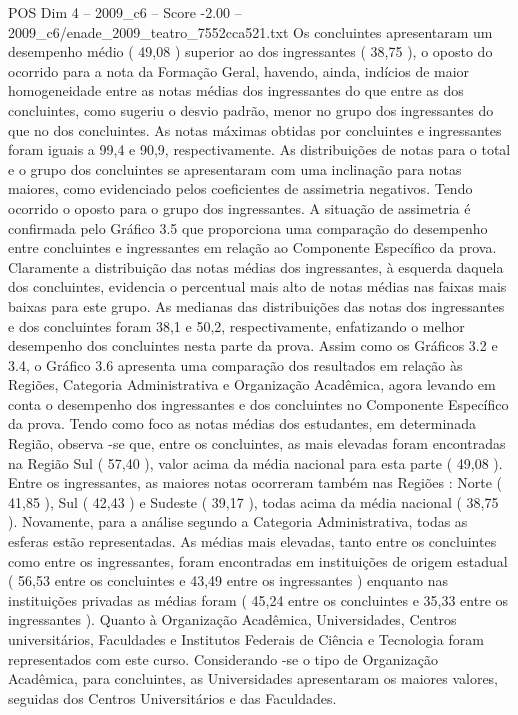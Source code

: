 \begin{textsample}{POS Dim 4 – 2009\_c6 – Score -2.00 – 2009\_c6/enade\_2009\_teatro\_7552cca521.txt}
Os concluintes apresentaram um desempenho médio ( 49,08 ) superior ao dos ingressantes ( 38,75 ), o oposto do ocorrido para a nota da Formação Geral, havendo, ainda, indícios de maior homogeneidade entre as notas médias dos ingressantes do que entre as dos concluintes, como sugeriu o desvio padrão, menor no grupo dos ingressantes do que no dos concluintes.
As notas máximas obtidas por concluintes e ingressantes foram iguais a 99,4 e 90,9, respectivamente.
As distribuições de notas para o total e o grupo dos concluintes se apresentaram com uma inclinação para notas maiores, como evidenciado pelos coeficientes de assimetria negativos.
Tendo ocorrido o oposto para o grupo dos ingressantes.
A situação de assimetria é confirmada pelo Gráfico 3.5 que proporciona uma comparação do desempenho entre concluintes e ingressantes em relação ao Componente Específico da prova.
Claramente a distribuição das notas médias dos ingressantes, à esquerda daquela dos concluintes, evidencia o percentual mais alto de notas médias nas faixas mais baixas para este grupo.
As medianas das distribuições das notas dos ingressantes e dos concluintes foram 38,1 e 50,2, respectivamente, enfatizando o melhor desempenho dos concluintes nesta parte da prova.
Assim como os Gráficos 3.2 e 3.4, o Gráfico 3.6 apresenta uma comparação dos resultados em relação às Regiões, Categoria Administrativa e Organização Acadêmica, agora levando em conta o desempenho dos ingressantes e dos concluintes no Componente Específico da prova.
Tendo como foco as notas médias dos estudantes, em determinada Região, observa -se que, entre os concluintes, as mais elevadas foram encontradas na Região Sul ( 57,40 ), valor acima da média nacional para esta parte ( 49,08 ).
Entre os ingressantes, as maiores notas ocorreram também nas Regiões : Norte ( 41,85 ), Sul ( 42,43 ) e Sudeste ( 39,17 ), todas acima da média nacional ( 38,75 ).
Novamente, para a análise segundo a Categoria Administrativa, todas as esferas estão representadas.
As médias mais elevadas, tanto entre os concluintes como entre os ingressantes, foram encontradas em instituições de origem estadual ( 56,53 entre os concluintes e 43,49 entre os ingressantes ) enquanto nas instituições privadas as médias foram ( 45,24 entre os concluintes e 35,33 entre os ingressantes ).
Quanto à Organização Acadêmica, Universidades, Centros universitários, Faculdades e Institutos Federais de Ciência e Tecnologia foram representados com este curso.
Considerando -se o tipo de Organização Acadêmica, para concluintes, as Universidades apresentaram os maiores valores, seguidas dos Centros Universitários e das Faculdades.

\end{textsample}
